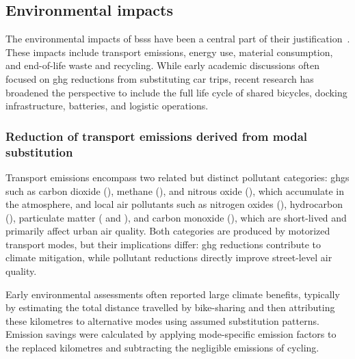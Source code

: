 \subsection{Environmental impacts}

The environmental impacts of \acp{bss} have been a central part of their justification~\cite{Shaheen2010, Fishman2016, Midgley2011}. These impacts include transport emissions, energy use, material consumption, and end-of-life waste and recycling. While early academic discussions often focused on \ac{ghg} reductions from substituting car trips, recent research has broadened the perspective to include the full life cycle of shared bicycles, docking infrastructure, batteries, and logistic operations.

        \subsubsection{Reduction of transport emissions derived from modal substitution} 
        \label{subsubsection:emissions_reduction}

        Transport emissions encompass two related but distinct pollutant categories: \acp{ghg} such as carbon dioxide (), methane (), and nitrous oxide (), which accumulate in the atmosphere, and local air pollutants such as nitrogen oxides (), hydrocarbon (), particulate matter ( and ), and carbon monoxide (), which are short-lived and primarily affect urban air quality. Both categories are produced by motorized transport modes, but their implications differ: \ac{ghg} reductions contribute to climate mitigation, while pollutant reductions directly improve street-level air quality.

        Early environmental assessments often reported large climate benefits, typically by estimating the total distance travelled by bike-sharing and then attributing these kilometres to alternative modes using assumed substitution patterns. Emission savings were calculated by applying mode-specific emission factors to the replaced kilometres and subtracting the negligible emissions of cycling.

